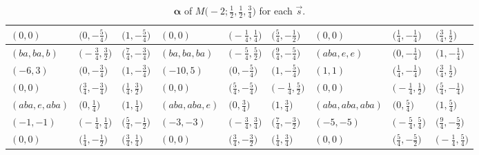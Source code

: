 \documentclass[10pt,a4paper]{amsart}
\def\bal{\boldsymbol{\alpha}}
\theoremstyle{definition}
\numberwithin{equation}{section}
\begin{document}
\begin{landscape}
\begin{table}[th]
\begin{tabular}{|lll|lll|lll|}
\\
$(0, 0)$ & $\bigl(0, -\frac{5}{4}\bigr)$ & $\bigl(1, -\frac{5}{4}\bigr)$ & $(0, 0)$ & $\bigl(-\frac{1}{4}, \frac{1}{4}\bigr)$ & $\bigl(\frac{5}{4}, -\frac{1}{2}\bigr)$ & $(0, 0)$ & $\bigl(\frac{1}{4}, -\frac{1}{4}\bigr)$ & $\bigl(\frac{3}{4}, \frac{1}{2}\bigr)$
\\\hline
$(ba, ba, b)$ & $\bigl(-\frac{3}{4}, \frac{3}{2}\bigr)$ & $\bigl(\frac{7}{4}, -\frac{3}{4}\bigr)$ & $(ba, ba, ba)$ & $\bigl(-\frac{5}{4}, \frac{5}{2}\bigr)$ & $\bigl(\frac{9}{4}, -\frac{5}{4}\bigr)$ & $(aba, e, e)$ & $\bigl(0, -\frac{1}{4}\bigr)$ & $\bigl(1, -\frac{1}{4}\bigr)$
\\
$(-6, 3)$ & $\bigl(0, -\frac{3}{4}\bigr)$ & $\bigl(1, -\frac{3}{4}\bigr)$ & $(-10, 5)$ & $\bigl(0, -\frac{5}{4}\bigr)$ & $\bigl(1, -\frac{5}{4}\bigr)$ & $(1, 1)$ & $\bigl(\frac{1}{4}, -\frac{1}{4}\bigr)$ & $\bigl(\frac{3}{4}, \frac{1}{2}\bigr)$
\\
$(0, 0)$ & $\bigl(\frac{3}{4}, -\frac{3}{4}\bigr)$ & $\bigl(\frac{1}{4}, \frac{3}{2}\bigr)$ & $(0, 0)$ & $\bigl(\frac{5}{4}, -\frac{5}{4}\bigr)$ & $\bigl(-\frac{1}{4}, \frac{5}{2}\bigr)$ & $(0, 0)$ & $\bigl(-\frac{1}{4}, \frac{1}{2}\bigr)$ & $\bigl(\frac{5}{4}, -\frac{1}{4}\bigr)$
\\\hline
$(aba, e, aba)$ & $\bigl(0, \frac{1}{4}\bigr)$ & $\bigl(1, \frac{1}{4}\bigr)$ & $(aba, aba, e)$ & $\bigl(0, \frac{3}{4}\bigr)$ & $\bigl(1, \frac{3}{4}\bigr)$ & $(aba, aba, aba)$ & $\bigl(0, \frac{5}{4}\bigr)$ & $\bigl(1, \frac{5}{4}\bigr)$
\\
$(-1, -1)$ & $\bigl(-\frac{1}{4}, \frac{1}{4}\bigr)$ & $\bigl(\frac{5}{4}, -\frac{1}{2}\bigr)$ & $(-3, -3)$ & $\bigl(-\frac{3}{4}, \frac{3}{4}\bigr)$ & $\bigl(\frac{7}{4}, -\frac{3}{2}\bigr)$ & $(-5, -5)$ & $\bigl(-\frac{5}{4}, \frac{5}{4}\bigr)$ & $\bigl(\frac{9}{4}, -\frac{5}{2}\bigr)$
 \\
$(0, 0)$ & $\bigl(\frac{1}{4}, -\frac{1}{2}\bigr)$ & $\bigl(\frac{3}{4}, \frac{1}{4}\bigr)$ & $(0, 0)$ & $\bigl(\frac{3}{4}, -\frac{3}{2}\bigr)$ & $\bigl(\frac{1}{4}, \frac{3}{4}\bigr)$ & $(0, 0)$ & $\bigl(\frac{5}{4}, -\frac{5}{2}\bigr)$ & $\bigl(-\frac{1}{4}, \frac{5}{4}\bigr)$
\\\hline
\end{tabular}
\caption{$\bal$ of $M\bigl( -2;\frac{1}{2},\frac{1}{2},\frac{3}{4} \bigr)$ for each $\vec s$.}\label{tab:balinrangeGeneral}
\end{table}

\end{landscape}
\end{document}
